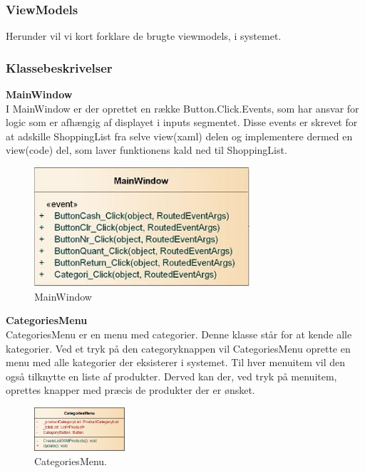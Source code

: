\subsubsection{ViewModels}
Herunder vil vi kort forklare de brugte viewmodels, i systemet.

\subsubsection{Klassebeskrivelser}
\textbf{MainWindow}\\
I MainWindow er der oprettet en række Button.Click.Events, som har ansvar for logic som er afhængig af displayet i inputs segmentet. Disse events er skrevet for at adskille ShoppingList fra selve view(xaml) delen og implementere dermed en view(code) del, som laver funktionens kald ned til ShoppingList. 

\begin{figure}[H]
	\centering
	\includegraphics[width=80mm]{Systemdesign/Frontend/GUI/Pics/Main}
	\caption{MainWindow}
	\label{fig:KasseMainWindowClass}
\end{figure}

\textbf{CategoriesMenu}\\
CategoriesMenu er en menu med categorier. Denne klasse står for at kende alle kategorier. Ved et tryk på den categoryknappen vil CategoriesMenu oprette en menu med alle kategorier der eksisterer i systemet. Til hver menuitem vil den også tilknytte en liste af produkter. Derved kan der, ved tryk på menuitem, oprettes knapper med præcis de produkter der er ønsket. 

\begin{figure}[H]
	\centering
	\includegraphics[width=0.3\textwidth]{Systemdesign/Frontend/pics/CategoriesMenu}
	\caption{CategoriesMenu.}
	\label{fig:PBC}
\end{figure}

